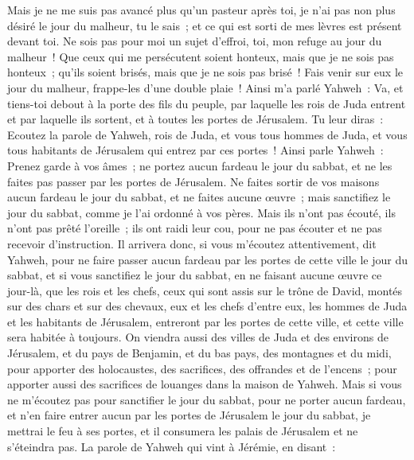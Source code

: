 \begin{multicols}{2}
Mais je ne me suis pas avancé plus qu'un pasteur après toi, je n'ai pas non plus désiré le jour du malheur, tu le sais~; et ce qui est sorti de mes lèvres est présent devant toi.
Ne sois pas pour moi un sujet d'effroi, toi, mon refuge au jour du malheur~!
Que ceux qui me persécutent soient honteux, mais que je ne sois pas honteux~; qu'ils soient brisés, mais que je ne sois pas brisé~! Fais venir sur eux le jour du malheur, frappe-les d'une double plaie~!
Ainsi m'a parlé Yahweh~: Va, et tiens-toi debout à la porte des fils du peuple, par laquelle les rois de Juda entrent et par laquelle ils sortent, et à toutes les portes de Jérusalem.
Tu leur diras~: Ecoutez la parole de Yahweh, rois de Juda, et vous tous hommes de Juda, et vous tous habitants de Jérusalem qui entrez par ces portes~!
Ainsi parle Yahweh~: Prenez garde à vos âmes~; ne portez aucun fardeau le jour du sabbat, et ne les faites pas passer par les portes de Jérusalem.
Ne faites sortir de vos maisons aucun fardeau le jour du sabbat, et ne faites aucune œuvre~; mais sanctifiez le jour du sabbat, comme je l'ai ordonné à vos pères.
Mais ils n'ont pas écouté, ils n'ont pas prêté l'oreille~; ils ont raidi leur cou, pour ne pas écouter et ne pas recevoir d'instruction.
Il arrivera donc, si vous m'écoutez attentivement, dit Yahweh, pour ne faire passer aucun fardeau par les portes de cette ville le jour du sabbat, et si vous sanctifiez le jour du sabbat, en ne faisant aucune œuvre ce jour-là,
que les rois et les chefs, ceux qui sont assis sur le trône de David, montés sur des chars et sur des chevaux, eux et les chefs d'entre eux, les hommes de Juda et les habitants de Jérusalem, entreront par les portes de cette ville, et cette ville sera habitée à toujours.
On viendra aussi des villes de Juda et des environs de Jérusalem, et du pays de Benjamin, et du bas pays, des montagnes et du midi, pour apporter des holocaustes, des sacrifices, des offrandes et de l'encens~; pour apporter aussi des sacrifices de louanges dans la maison de Yahweh.
Mais si vous ne m'écoutez pas pour sanctifier le jour du sabbat, pour ne porter aucun fardeau, et n'en faire entrer aucun par les portes de Jérusalem le jour du sabbat, je mettrai le feu à ses portes, et il consumera les palais de Jérusalem et ne s'éteindra pas.
\VerseOne{}La parole de Yahweh qui vint à Jérémie, en disant~:

\end{multicols}
